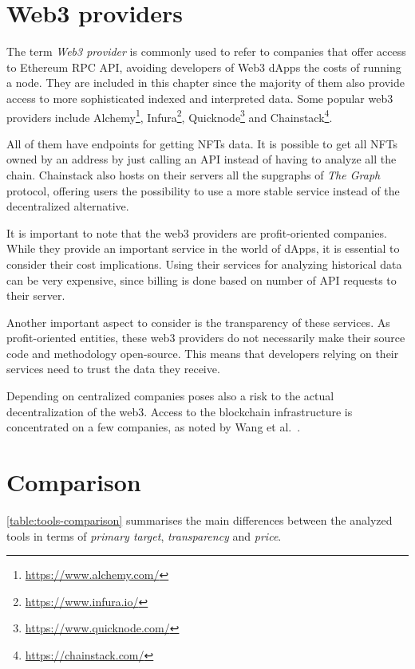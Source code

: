 \section{Web3 providers}

The term \textit{Web3 provider} is commonly used to refer to companies that offer access to Ethereum RPC API, avoiding developers of Web3 dApps the costs of running a node. They are included in this chapter since the majority of them also provide access to more sophisticated indexed and interpreted data. Some popular web3 providers include Alchemy\footnote{\url{https://www.alchemy.com/}}, Infura\footnote{\url{https://www.infura.io/}}, Quicknode\footnote{\url{https://www.quicknode.com/}} and Chainstack\footnote{\url{https://chainstack.com/}}.

All of them have endpoints for getting NFTs data. It is possible to get all NFTs owned by an address by just calling an API instead of having to analyze all the chain. Chainstack also hosts on their servers all the supgraphs of \textit{The Graph} protocol, offering users the possibility to use a more stable service instead of the decentralized alternative.

It is important to note that the web3 providers are profit-oriented companies. While they provide an important service in the world of dApps, it is essential to consider their cost implications. Using their services for analyzing historical data can be very expensive, since billing is done based on number of API requests to their server.

Another important aspect to consider is the transparency of these services. As profit-oriented entities, these web3 providers do not necessarily make their source code and methodology open-source. This means that developers relying on their services need to trust the data they receive. 

Depending on centralized companies poses also a risk to the actual decentralization of the web3. Access to the blockchain infrastructure is concentrated on a few companies, as noted by Wang et al.~\cite{wang2022exploring}.

\section{Comparison}

\cref{table:tools-comparison} summarises the main differences between the analyzed tools in terms of \textit{primary target}, \textit{transparency} and \textit{price}.

